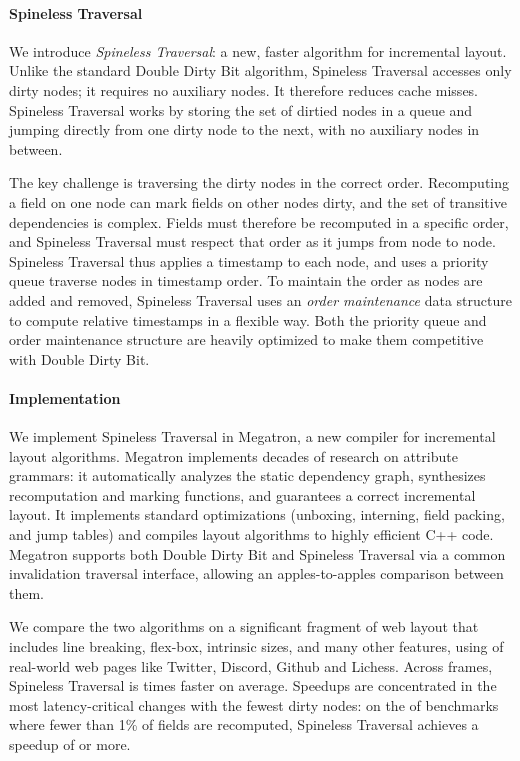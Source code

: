 \paragraph{Spineless Traversal}

We introduce \textit{Spineless Traversal}:
  a new, faster algorithm for incremental layout.
Unlike the standard Double Dirty Bit algorithm,
  Spineless Traversal accesses only dirty nodes;
  it requires no auxiliary nodes.
It therefore reduces cache misses.
Spineless Traversal works by
  storing the set of dirtied nodes in a queue
  and jumping directly from one dirty node to the next,
  with no auxiliary nodes in between.

The key challenge is traversing the dirty nodes in the correct order. 
Recomputing a field on one node
  can mark fields on other nodes dirty,
  and the set of transitive dependencies is complex.
Fields must therefore be recomputed in a specific order,
  and Spineless Traversal must respect that order
  as it jumps from node to node.
Spineless Traversal thus applies
  a timestamp to each node,
  and uses a priority queue traverse nodes
  in timestamp order.
To maintain the order as nodes are added and removed,
  Spineless Traversal uses an \emph{order maintenance} data structure
  to compute relative timestamps in a flexible way.
Both the priority queue and order maintenance structure
  are heavily optimized to make them competitive with Double Dirty Bit.

\paragraph{Implementation}

We implement Spineless Traversal in Megatron,
  a new compiler for incremental layout algorithms.
Megatron implements decades of research on attribute grammars:
  it automatically analyzes the static dependency graph,
  synthesizes recomputation and marking functions,
  and guarantees a correct incremental layout.
It implements standard optimizations
  (unboxing, interning, field packing, and jump tables)
  and compiles layout algorithms to highly efficient C++ code.
Megatron supports both Double Dirty Bit and Spineless Traversal
  via a common invalidation traversal interface,
  allowing an apples-to-apples comparison between them.

We compare the two algorithms on
  a significant fragment of web layout that includes
  line breaking, flex-box, intrinsic sizes, and many other features,
  using \TotalTraceCount of real-world web pages
  like Twitter, Discord, Github and Lichess.
Across \TotalDiffCount frames,
  Spineless Traversal is \DBPQtotal times faster on average.
Speedups are concentrated in the most latency-critical changes
  with the fewest dirty nodes:
  on the \PctSmall of benchmarks
  where fewer than 1\% of fields are recomputed,
  Spineless Traversal achieves a speedup
  of \MeanSpeedupSmall or more.
